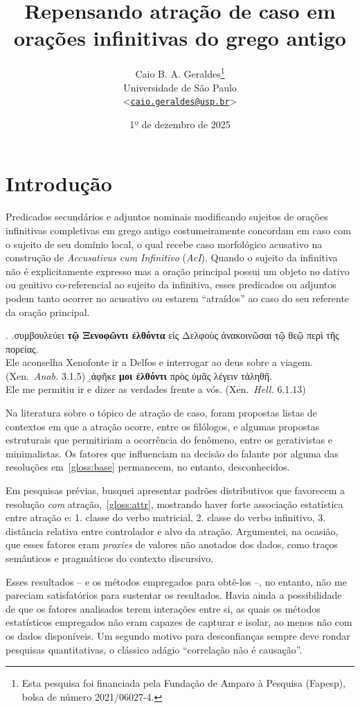 \documentclass[a4paper, 12pt, article]{memoir}
\title{Repensando atração de caso em orações infinitivas do grego antigo}
\author{
  Caio B. A. Geraldes\thanks{
		Esta pesquisa foi financiada pela Fundação de Amparo à Pesquisa (Fapesp),
  bolsa de número 2021/06027-4.}
	\\\smallskip
	Universidade de São Paulo
	\\\smallskip
	<\href{mailto:caio.geraldes@usp.br}{\texttt{caio.geraldes@usp.br}}>
}
\date{1º de dezembro de 2025}
\begin{document}
\maketitle

\chapter{Introdução} %

Predicados secundários e adjuntos nominais modificando sujeitos de orações
infinitivas completivas em grego antigo costumeiramente concordam em caso com
o sujeito de seu domínio local, o qual recebe caso morfológico acusativo na
construção de \emph{Accusativus cum Infinitivo} (\emph{AcI}).
Quando o sujeito da infinitiva não é explicitamente expresso mas a oração
principal possui um objeto no dativo ou genitivo co\hyp{}referencial ao sujeito
da infinitiva, esses predicados ou adjuntos podem tanto ocorrer no acusativo ou
estarem ``atraídos'' ao caso do seu referente da oração principal.

\ex.\label{gloss:base}
\a.\label{gloss:noattr}συμβουλεύει \textbf{τῷ Ξενοφῶντι ἐλθόντα} {εἰς Δελφοὺς}
ἀνακοινῶσαι {τῷ θεῷ} {περὶ τῆς πορείας}.\\
Ele aconselha Xenofonte ir a Delfos e interrogar ao deus sobre a viagem.
(Xen.\ \emph{Anab.} 3.1.5)
\b.\label{gloss:attr}ἀφῆκε \textbf{μοι ἐλθόντι} {πρὸς ὑμᾶς} λέγειν τἀληθῆ.\\
Ele me permitiu ir e dizer as verdades frente a vós.
(Xen.\ \emph{Hell.} 6.1.13)

Na literatura sobre o tópico de atração de caso, foram propostas listas de
contextos em que a atração ocorre, entre os filólogos, e algumas propostas
estruturais que permitiriam a ocorrência do fenômeno, entre os gerativistas e
minimalistas.
Os fatores que influenciam na decisão do falante por alguma das resoluções
em~\ref{gloss:base} permanecem, no entanto, desconhecidos.

Em pesquisas prévias, busquei apresentar padrões distributivos que favorecem a
resolução \emph{com} atração,~\ref{gloss:attr}, mostrando haver forte associação
estatística entre atração e: 1. classe do verbo matricial, 2. classe do verbo
infinitivo, 3. distância relativa entre controlador e alvo da atração.
Argumentei, na ocasião, que esses fatores eram \emph{proxies} de valores não
anotados dos dados, como traços semânticos e pragmáticos do contexto discursivo.

Esses resultados -- e os métodos empregados para obtê-los --, no entanto, não
me pareciam satisfatórios para sustentar os resultados.
Havia ainda a possibilidade de que os fatores analisados terem interações entre
si, as quais os métodos estatísticos empregados não eram capazes de capturar e
isolar, ao menos não com os dados disponíveis.
Um segundo motivo para desconfianças sempre deve rondar pesquisas quantitativas,
o clássico adágio ``correlação não é causação''.
\end{document}
